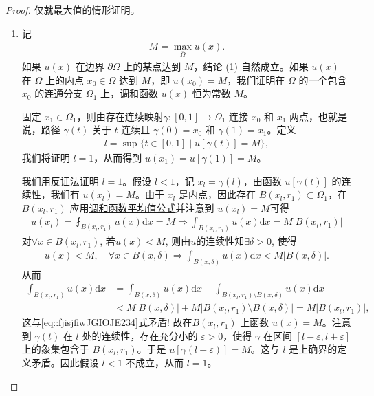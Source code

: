 \documentclass[../../main.tex]{subfiles}%
\begin{document}
\begin{proof}
仅就最大值的情形证明。
\begin{enumerate}[(1)]
\item 记
\begin{align*}
M = \max_{\overline{\Omega}} u(x).
\end{align*}
如果 $u(x)$ 在边界 $\partial\Omega$ 上的某点达到 $M$，结论 (1) 自然成立。如果 $u(x)$ 在 $\Omega$ 上的内点 $x_0\in\Omega$ 达到 $M$，即 $u(x_0)=M$，我们证明在 $\Omega$ 的一个包含 $x_0$ 的连通分支 $\Omega_1$ 上，调和函数 $u(x)$ 恒为常数 $M$。

固定 $x_1\in\Omega_1$，则由存在连续映射$\gamma:[0,1]\to\Omega_1$ 连接 $x_0$ 和 $x_1$ 两点，也就是说，路径 $\gamma(t)$ 关于 $t$ 连续且 $\gamma(0)=x_0$ 和 $\gamma(1)=x_1$。定义
\begin{align*}
l = \sup\{t\in[0,1] \mid u[\gamma(t)] = M\},
\end{align*}
我们将证明 $l=1$，从而得到 $u(x_1)=u[\gamma(1)]=M$。

我们用反证法证明 $l=1$。假设 $l<1$，记 $x_l=\gamma(l)$，由函数 $u[\gamma(t)]$ 的连续性，我们有 $u(x_l)=M$。由于 $x_l$ 是内点，因此存在 $B(x_l,r_1)\subset\Omega_1$，在 $B(x_l,r_1)$ 应用\hyperref[theorem:调和函数平均值公式]{调和函数平均值公式}并注意到 $u(x_l)=M$可得
\begin{align}
u(x_l)=\fint_{B\left( x_l,r_1 \right)}{u\left( x \right) \mathrm{d}x}=M\Longrightarrow \int_{B\left( x_l,r_1 \right)}{u\left( x \right) \mathrm{d}x}=M|B(x_l,r_1)|\label{eq::fjisjfiwJGIOJE234}
\end{align}
对$\forall x\in B(x_l,r_1)$, 若$u(x) < M$, 则由$u$的连续性知$\exists \delta > 0$, 使得
\begin{align*}
u(x) < M, \quad \forall x\in B(x,\delta) \Longrightarrow \int_{B(x,\delta)} u(x) \mathrm{d}x < M\left|B(x,\delta)\right|.
\end{align*}
从而
\begin{align*}
\int_{B(x_l,r_1)} u(x) \mathrm{d}x &= \int_{B(x,\delta)} u(x) \mathrm{d}x + \int_{B(x_l,r_1) \setminus B(x,\delta)} u(x) \mathrm{d}x \\
&< M\left|B(x,\delta)\right| + M\left|B(x_l,r_1) \setminus B(x,\delta)\right| 
= M\left|B(x_l,r_1)\right|,
\end{align*}
这与\eqref{eq::fjisjfiwJGIOJE234}式矛盾!
故在$B(x_l,r_1)$ 上函数 $u(x)=M$。注意到 $\gamma(t)$ 在 $l$ 处的连续性，存在充分小的 $\varepsilon>0$，使得 $\gamma$ 在区间 $[l-\varepsilon,l+\varepsilon]$ 上的象集包含于 $B(x_l,r_1)$。于是 $u[\gamma(l+\varepsilon)]=M$。这与 $l$ 是上确界的定义矛盾。因此假设 $l<1$ 不成立，从而 $l=1$。


\end{enumerate}
\end{proof}
\end{document}
